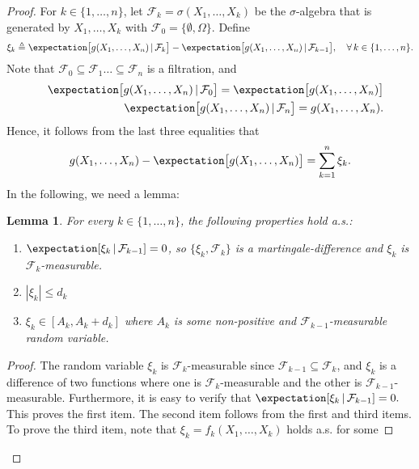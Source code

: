 \documentclass{article}
\theoremstyle{plain}
\newtheorem{lemma}[theorem]{Lemma}
\begin{document}
\begin{proof}
For $k \in \{1, \ldots, n\}$, let
$\mathcal{F}_k = \sigma(X_1, \ldots, X_k)$ be the $\sigma$-algebra that is generated
by $X_1, \ldots, X_k$ with $\mathcal{F}_0 = \{\emptyset, \Omega\}$. Define
\begin{equation}
\xi_k \triangleq \expectation \bigl[ g(X_1, \ldots, X_n) \, | \, \mathcal{F}_k \bigr]
- \expectation \bigl[ g(X_1, \ldots, X_n) \, | \, \mathcal{F}_{k-1} \bigr], \quad
\forall \, k \in \{1, \ldots, n\}.
\label{eq: martingale difference}
\end{equation}
Note that $\mathcal{F}_0 \subseteq \mathcal{F}_1 \ldots \subseteq \mathcal{F}_n$
is a filtration, and
\begin{eqnarray}
&& \expectation \bigl[ g(X_1, \ldots, X_n) \, | \, \mathcal{F}_0 \bigr] =
\expectation \bigl[ g(X_1, \ldots, X_n) \bigr] \nonumber \\
&& \expectation \bigl[ g(X_1, \ldots, X_n) \, | \, \mathcal{F}_n \bigr] =
g(X_1, \ldots, X_n).
\end{eqnarray}
Hence, it follows from the last three equalities that
\begin{equation*}
g(X_1, \ldots, X_n) - \expectation \bigl[ g(X_1, \ldots, X_n) \bigr] = \sum_{k=1}^n \xi_k.
\end{equation*}
In the following, we need a lemma:
\begin{lemma}
For every $k \in \{1, \ldots, n\}$, the following properties hold a.s.:
\begin{enumerate}
\item $\expectation[\xi_k \, | \, \mathcal{F}_{k-1}] = 0$, so $\{\xi_k, \mathcal{F}_k\}$
is a martingale-difference and $\xi_k$ is $\mathcal{F}_k$-measurable.
\item $|\xi_k| \leq d_k$
\item $\xi_k \in [A_k, A_k + d_k]$ where $A_k$ is some non-positive and
$\mathcal{F}_{k-1}$-measurable random variable.
\end{enumerate}
\end{lemma}
\begin{proof}
The random variable $\xi_k$ is $\mathcal{F}_k$-measurable since
$\mathcal{F}_{k-1} \subseteq \mathcal{F}_k$, and $\xi_k$ is a difference
of two functions where one is $\mathcal{F}_k$-measurable and the other
is $\mathcal{F}_{k-1}$-measurable. Furthermore, it is easy to verify that
$\expectation[\xi_k \, | \, \mathcal{F}_{k-1}] = 0.$ This proves the first item.
The second item follows from the first and third items. To prove the third item,
note that $\xi_k = f_k(X_1, \ldots, X_k)$ holds a.s. for some

\end{proof}
\end{proof}
\end{document}

